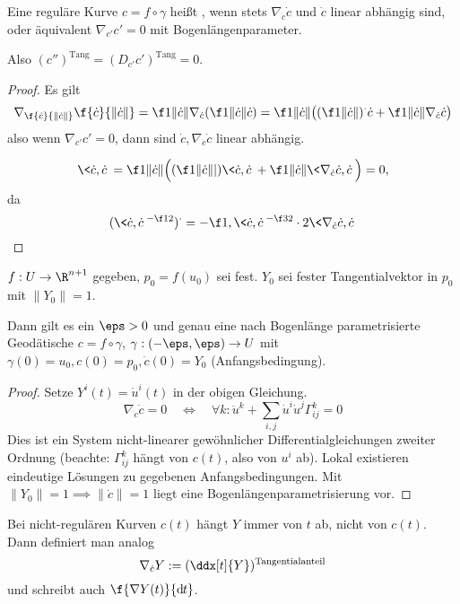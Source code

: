 \begin{df}
	Eine reguläre Kurve $c = f \circ \gamma$ heißt , wenn stets $\nabla_{\dot c} \dot c$ und $\dot c$ linear abhängig sind, oder äquivalent $\nabla_{c'} c' = 0$ mit Bogenlängenparameter.
	\begin{note}
		Also $(c'')^{\text{Tang}} = (D_{c'} c')^{\text{Tang}} = 0$.
	\end{note}
	\begin{proof}
		Es gilt
		\[
			\nabla_{\f{\dot c}{\|\dot c\|}} \f{\dot c}{\|\dot c\|}
			= \f 1{\|\dot c\|} \nabla_{\dot c} (\f 1{\|\dot c\|} \dot c)
			= \f 1{\|\dot c\|} \big( (\f 1{\|\dot c\|})^{\cdot} \dot c + \f 1{\|\dot c\|} \nabla_{\dot c}\dot c \big)
		\]
		also wenn $\nabla_{c'} c' = 0$, dann sind $\dot c, \nabla_{\dot c} \dot c$ linear abhängig.

		\[
			\< \dot c, \dot c\> = \f 1{\|\dot c\|} \Big( (\f 1{\|\dot c\||}) \< \dot c, \dot c \> + \f 1{\|\dot c\|} \< \nabla_{\dot c} \dot c, \dot c \> \Big)
			= 0,
		\]
		da
		\[
			(\<\dot c, \dot c\>^{-\f 12})^{\cdot}
			= - \f 1, \< \dot c, \dot c \>^{-\f 32} \cdot 2 \< \nabla_{\dot c} \dot c, \dot c\>
		\]
	\end{proof}
\end{df}

\begin{st}
	$f: U \to \R^{n+1}$ gegeben, $p_0 = f(u_0)$ sei fest.
	$Y_0$ sei fester Tangentialvektor in $p_0$ mit $\|Y_0\| = 1$.

	Dann gilt es ein $\eps > 0$ und genau eine nach Bogenlänge parametrisierte Geodätische $c = f \circ \gamma$, $\gamma: (-\eps,\eps) \to U$ mit $\gamma(0) = u_0 , c(0) = p_0, \dot c(0) = Y_0$ (Anfangsbedingung).
	\begin{proof}
		Setze $Y^i(t) = \dot u^i(t)$ in der obigen Gleichung.
		\[
			\nabla_{\dot c} \dot c = 0
			\quad\iff\quad
			\forall k : \ddot u^k + \sum_{i,j} \dot u^i \dot u^j \Gamma_{ij}^k = 0
		\]
		Dies ist ein System nicht-linearer gewöhnlicher Differentialgleichungen zweiter Ordnung (beachte: $\Gamma_{ij}^k$ hängt von $c(t)$, also von $u^i$ ab).
		Lokal existieren eindeutige Lösungen zu gegebenen Anfangsbedingungen.
		Mit $\|Y_0\| = 1 \implies \|\dot c\| = 1$ liegt eine Bogenlängenparametrisierung vor.
	\end{proof}
\end{st}

Bei nicht-regulären Kurven $c(t)$ hängt $Y$ immer von $t$ ab, nicht von $c(t)$.
Dann definiert man analog
\[
	\nabla_{\dot c} Y := (\ddx[t]{Y})^{\text{Tangentialanteil}}
\]
und schreibt auch $\f {\nabla Y(t)}{\dx[t]}$.

